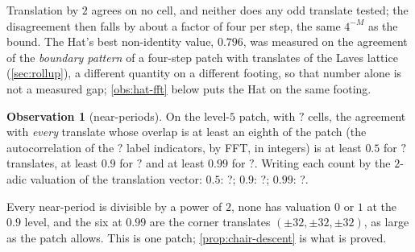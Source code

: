 \documentclass[11pt,a4paper]{article}
\newcommand{\SSChLabels}{?}\newcommand{\SSChNonSingleton}{?}
\newcommand{\SSChScanCells}{?}\newcommand{\SSChScanFull}{?}
\newcommand{\SSChScanFullVal}{?}\newcommand{\SSChScanHalf}{?}
\newcommand{\SSChScanHalfVal}{?}\newcommand{\SSChScanNinety}{?}
\newcommand{\SSChScanNinetyVal}{?}\newcommand{\SSChSets}{?}
\theoremstyle{plain}
\theoremstyle{definition}
\newtheorem{observation}{Observation}
\begin{document}
Translation by $2$ agrees on no cell, and neither does any odd translate tested; the
disagreement then falls by about a factor of four per step, the same $4^{-M}$ as the
bound. The Hat's best non-identity value, $0.796$, was measured on the agreement of the
\emph{boundary pattern} of a four-step patch with translates of the Laves lattice
(\cref{sec:rollup}), a different quantity on a different footing, so that number alone
is not a measured gap; \cref{obs:hat-fft} below puts the Hat on the same footing.

\begin{observation}[near-periods]
\label{obs:chair-periods}
On the level-$5$ patch, with $\SSChScanCells{}$ cells, the agreement with \emph{every}
translate whose overlap is at least an eighth of the patch (the autocorrelation of the
$\SSChLabels{}$ label indicators, by FFT, in integers) is at least $0.5$ for
$\SSChScanHalf{}$ translates, at least $0.9$ for $\SSChScanNinety{}$ and at least $0.99$
for $\SSChScanFull{}$. Writing each count by the $2$-adic valuation of the translation
vector: $0.5$: \SSChScanHalfVal{}; $0.9$: \SSChScanNinetyVal{}; $0.99$: \SSChScanFullVal{}.
\end{observation}

Every near-period is divisible by a power of $2$, none has valuation $0$ or $1$ at the
$0.9$ level, and the six at $0.99$ are the corner translates $(\pm32,\pm32,\pm32)$, as
large as the patch allows. This is one patch; \cref{prop:chair-descent} is what is proved.
\end{document}
